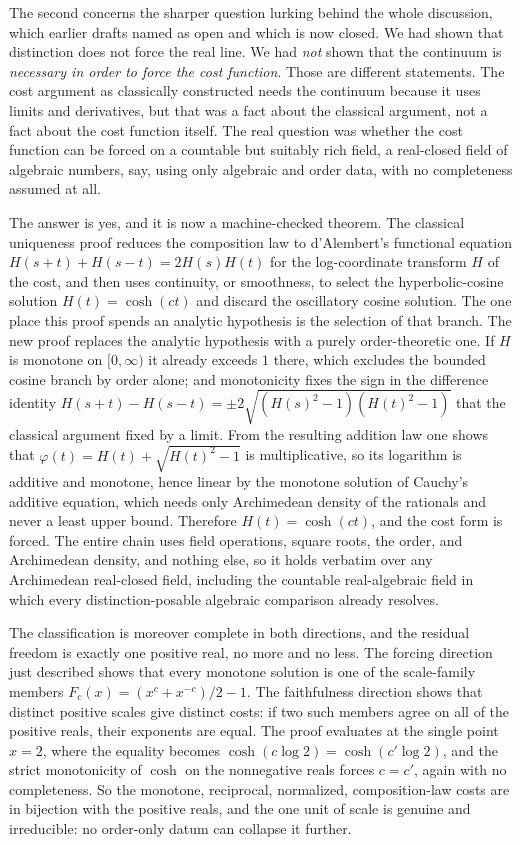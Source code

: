 \documentclass[11pt,a4paper]{article}
\theoremstyle{definition}
\theoremstyle{remark}
\begin{document}
The second concerns the sharper question lurking behind the whole discussion,
which earlier drafts named as open and which is now closed. We had shown that
distinction does not force the real line. We had \emph{not} shown that the
continuum is \emph{necessary in order to force the cost function}. Those are
different statements. The cost argument as classically constructed needs the
continuum because it uses limits and derivatives, but that was a fact about the
classical argument, not a fact about the cost function itself. The real question
was whether the cost function can be forced on a countable but suitably rich
field, a real-closed field of algebraic numbers, say, using only algebraic and
order data, with no completeness assumed at all.

The answer is yes, and it is now a machine-checked theorem. The classical
uniqueness proof reduces the composition law to d'Alembert's functional equation
$H(s+t)+H(s-t)=2H(s)H(t)$ for the log-coordinate transform $H$ of the cost, and
then uses continuity, or smoothness, to select the hyperbolic-cosine solution
$H(t)=\cosh(ct)$ and discard the oscillatory cosine solution. The one place this
proof spends an analytic hypothesis is the selection of that branch. The new
proof replaces the analytic hypothesis with a purely order-theoretic one. If $H$
is monotone on $[0,\infty)$ it already exceeds $1$ there, which excludes the
bounded cosine branch by order alone; and monotonicity fixes the sign in the
difference identity $H(s+t)-H(s-t)=\pm 2\sqrt{(H(s)^2-1)(H(t)^2-1)}$ that the
classical argument fixed by a limit. From the resulting addition law one shows
that $\varphi(t)=H(t)+\sqrt{H(t)^2-1}$ is multiplicative, so its logarithm is
additive and monotone, hence linear by the monotone solution of Cauchy's additive
equation, which needs only Archimedean density of the rationals and never a least
upper bound. Therefore $H(t)=\cosh(ct)$, and the cost form is forced. The entire
chain uses field operations, square roots, the order, and Archimedean density,
and nothing else, so it holds verbatim over any Archimedean real-closed field,
including the countable real-algebraic field in which every distinction-posable
algebraic comparison already resolves.

The classification is moreover complete in both directions, and the residual
freedom is exactly one positive real, no more and no less. The forcing direction
just described shows that every monotone solution is one of the scale-family
members $F_c(x)=(x^c+x^{-c})/2-1$. The faithfulness direction shows that distinct
positive scales give distinct costs: if two such members agree on all of the
positive reals, their exponents are equal. The proof evaluates at the single
point $x=2$, where the equality becomes $\cosh(c\log 2)=\cosh(c'\log 2)$, and the
strict monotonicity of $\cosh$ on the nonnegative reals forces $c=c'$, again with
no completeness. So the monotone, reciprocal, normalized, composition-law costs
are in bijection with the positive reals, and the one unit of scale is genuine and
irreducible: no order-only datum can collapse it further.
\end{document}

